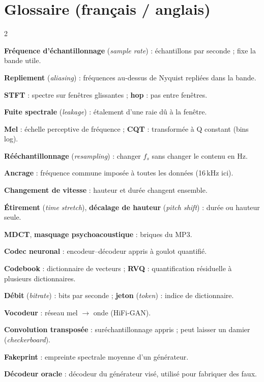 \documentclass[10pt,a4paper]{article}
\begin{document}
\section{Glossaire (français / anglais)}\label{app:glossaire}
\footnotesize
\begin{multicols}{2}
\raggedright
\textbf{Fréquence d'échantillonnage} (\emph{sample rate}) : échantillons par seconde ; fixe la bande utile.\par
\textbf{Repliement} (\emph{aliasing}) : fréquences au-dessus de Nyquist repliées dans la bande.\par
\textbf{STFT} : spectre sur fenêtres glissantes ; \textbf{hop} : pas entre fenêtres.\par
\textbf{Fuite spectrale} (\emph{leakage}) : étalement d'une raie dû à la fenêtre.\par
\textbf{Mel} : échelle perceptive de fréquence ; \textbf{CQT} : transformée à Q constant (bins log).\par
\textbf{Rééchantillonnage} (\emph{resampling}) : changer $f_s$ sans changer le contenu en Hz.\par
\textbf{Ancrage} : fréquence commune imposée à toutes les données (16\,kHz ici).\par
\textbf{Changement de vitesse} : hauteur et durée changent ensemble.\par
\textbf{Étirement} (\emph{time stretch}), \textbf{décalage de hauteur} (\emph{pitch shift}) : durée ou hauteur seule.\par
\textbf{MDCT}, \textbf{masquage psychoacoustique} : briques du MP3.\par
\textbf{Codec neuronal} : encodeur--décodeur appris à goulot quantifié.\par
\textbf{Codebook} : dictionnaire de vecteurs ; \textbf{RVQ} : quantification résiduelle à plusieurs dictionnaires.\par
\textbf{Débit} (\emph{bitrate}) : bits par seconde ; \textbf{jeton} (\emph{token}) : indice de dictionnaire.\par
\textbf{Vocodeur} : réseau mel $\to$ onde (HiFi-GAN).\par
\textbf{Convolution transposée} : suréchantillonnage appris ; peut laisser un damier (\emph{checkerboard}).\par
\textbf{Fakeprint} : empreinte spectrale moyenne d'un générateur.\par
\textbf{Décodeur oracle} : décodeur du générateur visé, utilisé pour fabriquer des faux.\par

\end{multicols}
\end{document}
